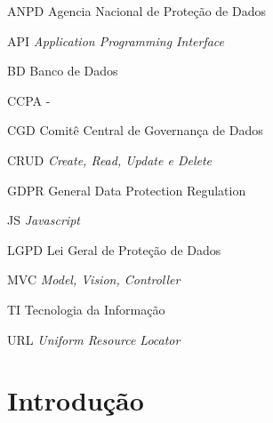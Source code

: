 \documentclass[
	12pt,				%
	openright,			%
	oneside,			%
	a4paper,			%
	english,			%
	french,				%
	spanish,			%
	brazil,				%
	]{abntex2}
\begin{document}
\listoffigures*
\cleardoublepage

\listoftables*
\cleardoublepage

\begin{siglas}
    \item[ANPD] Agencia Nacional de Proteção de Dados
    \item[API] \textit{Application Programming Interface}
    \item[BD] Banco de Dados
    \item[CCPA] -
    \item[CGD] Comitê Central de Governança de Dados
    \item[CRUD] \textit{Create, Read, Update e Delete}
    \item[GDPR]  General Data Protection Regulation
    \item [JS] \textit{Javascript}
    \item[LGPD] Lei Geral de Proteção de Dados
    \item[MVC] \textit{Model, Vision, Controller}
    \item[TI] Tecnologia da Informação
    \item[URL] \textit{Uniform Resource Locator}
\end{siglas}


\tableofcontents*



\textual
\setcounter{page}{1}
\chapter*{Introdução}
\label{chapter:introducao}
\end{document}
